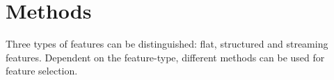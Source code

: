 \section{Methods}
\label{sec:methods}


Three types of features can be distinguished: flat, structured and streaming features. Dependent on the feature-type, different methods can be used for feature selection.





	
